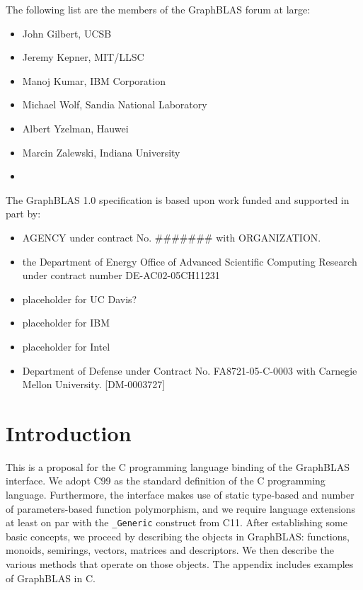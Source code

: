\documentclass[11pt]{extarticle}
\begin{document}
The following list are the members of the GraphBLAS forum at large:
\begin{itemize}
\item John Gilbert, UCSB
\item Jeremy Kepner, MIT/LLSC
\item Manoj Kumar, IBM Corporation
\item Michael Wolf, Sandia National Laboratory
\item Albert Yzelman, Hauwei
\item Marcin Zalewski, Indiana University
\item {}
\end{itemize}

The GraphBLAS 1.0 specification is based upon work funded and supported in part by:
\begin{itemize}
\item AGENCY under contract No. \#\#\#\#\#\#\# with ORGANIZATION.
\item the Department of Energy Office of Advanced Scientific Computing Research under contract number DE-AC02-05CH11231
\item placeholder for UC Davis?
\item placeholder for IBM
\item placeholder for Intel
\item Department of Defense under Contract No. FA8721-05-C-0003 with Carnegie Mellon University. [DM-0003727]
\end{itemize}
\pagebreak




\section{Introduction}

This is a proposal for the C programming language binding of the GraphBLAS
interface. We adopt C99 as the standard definition of the C programming
language. Furthermore, the interface makes use of static type-based and
number of parameters-based function polymorphism, and we require language
extensions at least on par with the {\tt \_Generic} construct from C11.
After establishing some basic concepts, we proceed by describing the
objects in GraphBLAS: functions, monoids, semirings, vectors, matrices
and descriptors. We then describe the various methods that operate on
those objects. The appendix includes examples of GraphBLAS in C.
\end{document}
